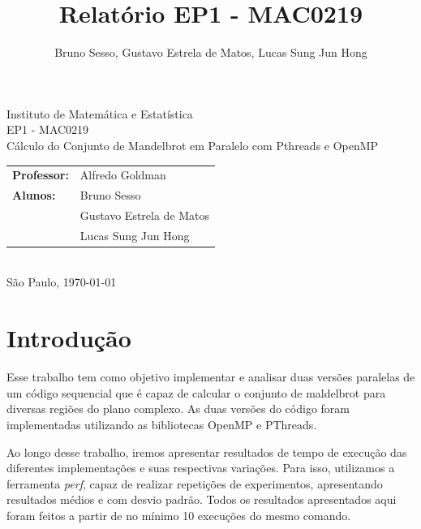 \documentclass[12pt]{article}
\title{Relatório EP1 - MAC0219}
\author{Bruno Sesso, Gustavo Estrela de Matos, Lucas Sung Jun Hong}
\begin{document}
\doublespacing
\begin{titlepage}
    \vfill
    \begin{center}
        \vspace{0.5\textheight}
        \noindent
        Instituto de Matemática e Estatística \\
        EP1 - MAC0219 \\
        \vfill
        \noindent
        {\Large Cálculo do Conjunto de Mandelbrot
        em Paralelo com Pthreads e OpenMP} \\
        \bigskip
        \bigskip
        \begin{tabular}{ll}
            {\bf Professor:} & {Alfredo Goldman} \\
            {\bf Alunos:}    & {Bruno Sesso} \\
                             & {Gustavo Estrela de Matos} \\
                             & {Lucas Sung Jun Hong} \\
        \end{tabular} \\
        \vspace{\fill}
       \bigskip
        São Paulo, \today \\
       \bigskip
    \end{center}
\end{titlepage}

\pagebreak
\tableofcontents
\pagebreak

\section{Introdução}
Esse trabalho tem como objetivo implementar e analisar duas versões
paralelas de um código sequencial que é capaz de calcular o conjunto de
maldelbrot para diversas regiões do plano complexo. As duas versões do
código foram implementadas utilizando as bibliotecas OpenMP e PThreads.

Ao longo desse trabalho, iremos apresentar resultados de tempo de 
execução das diferentes implementações e suas respectivas variações.
Para isso, utilizamos a ferramenta {\em perf}, capaz de realizar 
repetições de experimentos, apresentando resultados médios e com desvio
padrão. Todos os resultados apresentados aqui foram feitos a partir de
no mínimo 10 execuções do mesmo comando.
        

\newpage
\end{document}
